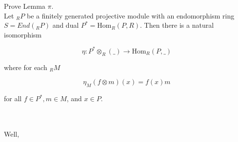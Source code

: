 Prove Lemma $\pi$.\\
Let $_RP$ be a finitely generated projective module with an endomorphism ring $S=End(_RP)$ and dual
$P^*=\text{Hom}_R(P,R)$. Then there is a natural isomorphism

$$\eta:P^*\otimes_R(\_)\to \text{Hom}_R(P,\_)$$

where for each $_RM$

$$\eta_M(f\otimes m)(x)=f(x)m$$

for all $f\in P^*, m\in M$, and $x\in P$.\\\\

\begin{solution}\renewcommand{\qedsymbol}{}\ \\
    Well,
\end{solution}